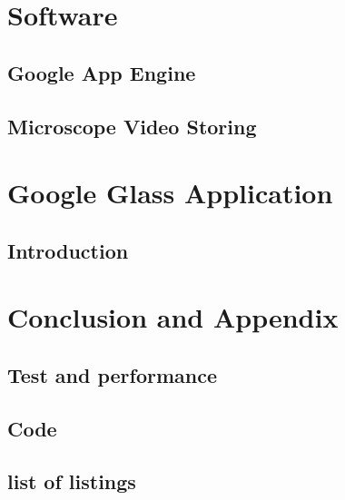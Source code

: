 \documentclass[a4paper,12pt,openany,twoside, abstracton]{book}%
\makeatletter
\newcommand*{\lolnoheading}{\@starttoc{lol}}
\makeatother
\begin{document}
\part{Software}
\chapter{Google App Engine}
\chapter{Microscope Video Storing}
\part{Google Glass Application}
\clearpage
\chapter{Introduction}\label{ch:IIIintroduction}


\clearpage
\part{Conclusion and Appendix}
\chapter{Test and performance}\label{sec:Perf}


\appendix
\chapter{Code}


\cite{SNOA529A}

\clearpage
\listoffigures
{}
\clearpage
\chapter*{list of listings}
\lolnoheading

%






\end{document}
